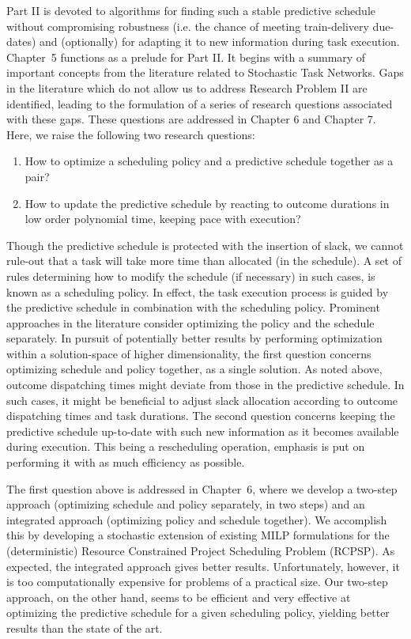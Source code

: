 Part II is devoted to algorithms for finding such a stable predictive schedule
without compromising robustness (i.e. the chance of meeting train-delivery due-dates)
and (optionally) for adapting it to new information during task execution.
Chapter~5 functions as a prelude for Part II.
It begins with a summary of important concepts from the literature related to Stochastic Task Networks.
Gaps in the literature which do not allow us to address Research Problem II are identified,
leading to the formulation of a series of research questions associated with these gaps.
These questions are addressed in Chapter 6 and Chapter 7.
Here, we raise the following two research questions:
\begin{enumerate}
	\item How to optimize a scheduling policy and a predictive schedule together as a pair?	
	\item How to update the predictive schedule by reacting to outcome durations in low order polynomial time, keeping pace with execution?
\end{enumerate}

Though the predictive schedule is protected with the insertion of slack,
we cannot rule-out that a task will take more time than allocated (in the schedule).
A set of rules determining how to modify the schedule (if necessary) in such cases, is known as a scheduling policy.
In effect, the task execution process is guided by the predictive schedule in combination with the scheduling policy.
Prominent approaches in the literature consider optimizing the policy and the schedule separately.
In pursuit of potentially better results by performing optimization within a solution-space of higher dimensionality, 
the first question concerns optimizing schedule and policy together, as a single solution.
As noted above, outcome dispatching times might deviate from those in the predictive schedule.
In such cases, it might be beneficial to adjust slack allocation according to outcome dispatching times and task durations.
The second question concerns keeping the predictive schedule up-to-date with such new information as it becomes available during execution.
This being a rescheduling operation, emphasis is put on performing it with as much efficiency as possible.

The first question above is addressed in Chapter~6,
where we develop a two-step approach (optimizing schedule and policy separately, in two steps) 
and an integrated approach (optimizing policy and schedule together).
We accomplish this by developing a stochastic extension of existing MILP formulations 
for the (deterministic) Resource Constrained Project Scheduling Problem (RCPSP).
As expected, the integrated approach gives better results.
Unfortunately, however, it is too computationally expensive for problems of a practical size.
Our two-step approach, on the other hand, seems to be efficient and very effective at optimizing the predictive schedule
for a given scheduling policy, yielding better results than the state of the art.

